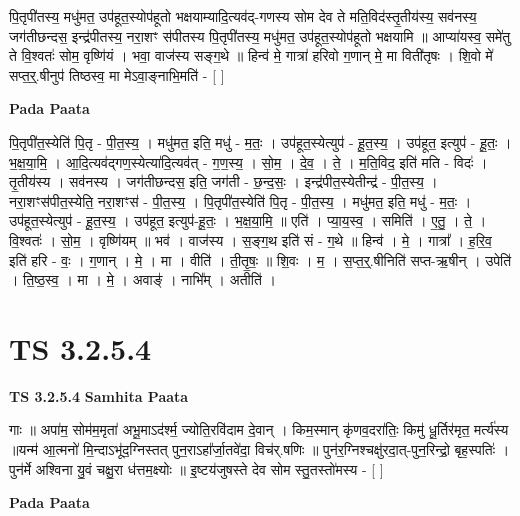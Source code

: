 \documentclass[17pt]{extarticle}
\begin{document}
पि॒तृपी॑तस्य॒ मधु॑मत॒ उप॑हूत॒स्योप॑हूतो भक्षयाम्यादि॒त्यव॑द्-गणस्य सोम देव ते मति॒विद॑स्तृ॒तीय॑स्य॒ सव॑नस्य॒ जग॑तीछन्दस॒ इन्द्र॑पीतस्य॒ नरा॒शꣳ स॑पीतस्य पि॒तृपी॑तस्य॒ मधु॑मत॒ उप॑हूत॒स्योप॑हूतो भक्षयामि ॥ आप्या॑यस्व॒ समे॑तु ते वि॒श्वतः॑ सोम॒ वृष्णि॑यं । भवा॒ वाज॑स्य सङ्ग॒थे ॥ हिन्व॑ मे॒ गात्रा॑ हरिवो ग॒णान् मे॒ मा विती॑तृषः । शि॒वो मे॑ सप्त॒र्॒.षीनुप॑ तिष्ठस्व॒ मा मेऽवा॒ङ्नाभि॒मति॑ - [  ] \newline

\textbf{Pada Paata} \newline

पि॒तृपी॑त॒स्येति॑ पि॒तृ - पी॒त॒स्य॒ । मधु॑मत॒ इति॒ मधु॑ - म॒तः॒ । उप॑हूत॒स्येत्युप॑ - हू॒त॒स्य॒ । उप॑हूत॒ इत्युप॑ - हू॒तः॒ । भ॒क्ष॒या॒मि॒ । आ॒दि॒त्यव॑द्गण॒स्येत्या॑दि॒त्यव॑त् - ग॒ण॒स्य॒ । सो॒म॒ । दे॒व॒ । ते॒ । म॒ति॒विद॒ इति॑ मति - विदः॑ । तृ॒तीय॑स्य । सव॑नस्य । जग॑तीछन्दस॒ इति॒ जग॑ती - छ॒न्द॒सः॒ । इन्द्र॑पीत॒स्येतीन्द्र॑ - पी॒त॒स्य॒ । नरा॒शꣳस॑पीत॒स्येति॒ नरा॒शꣳस॑ - पी॒त॒स्य॒ । पि॒तृपी॑त॒स्येति॑ पि॒तृ - पी॒त॒स्य॒ । मधु॑मत॒ इति॒ मधु॑ - म॒तः॒ । उप॑हूत॒स्येत्युप॑ - हू॒त॒स्य॒ । उप॑हूत॒ इत्युप॑-हू॒तः॒ । भ॒क्ष॒या॒मि॒ ॥ एति॑ । प्या॒य॒स्व॒ । समिति॑ । ए॒तु॒ । ते॒ । वि॒श्वतः॑ । सो॒म॒ । वृष्णि॑यम् ॥ भव॑ । वाज॑स्य । स॒ङ्ग॒थ इति॑ सं - ग॒थे ॥ हिन्व॑ । मे॒ । गात्रा᳚ । ह॒रि॒व॒ इति॑ हरि - वः॒ । ग॒णान् । मे॒ । मा । वीति॑ । ती॒तृ॒षः॒ ॥ शि॒वः । म॒ । स॒प्त॒र्॒.षीनिति॑ सप्त-ऋ॒षीन् । उपेति॑ । ति॒ष्ठ॒स्व॒ । मा । मे॒ । अवाङ्॑ । नाभि᳚म् । अतीति॑ ।  \newline





\section{ TS 3.2.5.4 }

\textbf{TS 3.2.5.4 } \newline
\textbf{Samhita Paata} \newline

गाः ॥ अपा॑म॒ सोम॑म॒मृता॑ अभू॒माऽद॑र्श्म॒ ज्योति॒रवि॑दाम दे॒वान् । किम॒स्मान् कृ॑णव॒दरा॑तिः॒ किमु॑ धू॒र्तिर॑मृत॒ मर्त्य॑स्य ॥यन्म॑ आ॒त्मनो॑ मि॒न्दाऽभू॑द॒ग्निस्तत् पुन॒राऽहा᳚र्जा॒तवे॑दा॒ विच॑र्.षणिः ॥ पुन॑र॒ग्निश्चक्षु॑रदा॒त्-पुन॒रिन्द्रो॒ बृह॒स्पतिः॑ । पुन॑र्मे अश्विना यु॒वं चक्षु॒रा ध॑त्तम॒क्ष्योः ॥ इ॒ष्टय॑जुषस्ते देव सोम स्तु॒तस्तो॑मस्य - [  ] \newline

\textbf{Pada Paata} \newline
\end{document}
